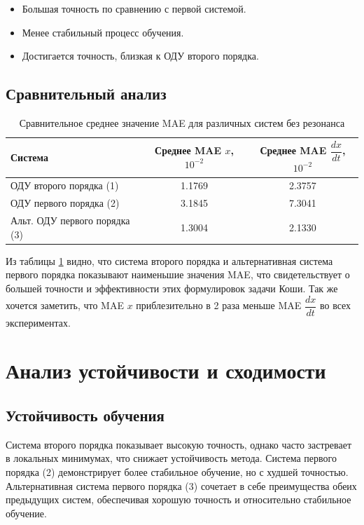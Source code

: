\documentclass[12pt,a4paper]{article}
\begin{document}
\begin{itemize}
    \item Большая точность по сравнению с первой системой.
    \item Менее стабильный процесс обучения.
    \item Достигается точность, близкая к ОДУ второго порядка.
\end{itemize}

\newpage

\subsection{Сравнительный анализ}
\begin{table}[H]
    \centering
    \begin{tabular}{|l|c|c|}
    \hline
    \textbf{Система} & \textbf{Среднее MAE $x$, $10^{-2}$} & \textbf{Среднее MAE $\dfrac{dx}{dt}$, $10^{-2}$} \\
    \hline
    ОДУ второго порядка (1) & 1.1769 & 2.3757 \\
    ОДУ первого порядка (2) & 3.1845 & 7.3041 \\
    Альт. ОДУ первого порядка (3) & 1.3004 & 2.1330 \\
    \hline
    \end{tabular}
    \caption{Сравнительное среднее значение MAE для различных систем без резонанса}
    \label{tab:comparative_mae}
\end{table}

Из таблицы \ref{tab:comparative_mae} видно, что система второго порядка и альтернативная система первого порядка показывают наименьшие значения MAE, что свидетельствует о большей точности и эффективности этих формулировок задачи Коши. Так же хочется заметить, что MAE $x$ приблезительно в 2 раза меньше MAE $\dfrac{dx}{dt}$ во всех экспериментах.

\section{Анализ устойчивости и сходимости}

\subsection{Устойчивость обучения}
Система второго порядка показывает высокую точность, однако часто застревает в локальных минимумах, что снижает устойчивость метода. Система первого порядка (2) демонстрирует более стабильное обучение, но с худшей точностью. Альтернативная система первого порядка (3) сочетает в себе преимущества обеих предыдущих систем, обеспечивая хорошую точность и относительно стабильное обучение.
\end{document}
